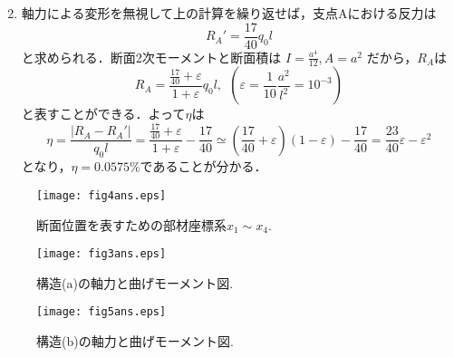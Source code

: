 \documentclass[10pt,a4j]{jarticle}
\begin{document}
\begin{enumerate}
\begin{equation}
		\label{eqn:}
	\end{equation}
\item
	軸力による変形を無視して上の計算を繰り返せば，支点Aにおける反力は
	\begin{equation}
		R_A'=\frac{17}{40}q_0l
	\end{equation}	
	と求められる．断面2次モーメントと断面積は
	$I=\frac{a^4}{12},A=a^2$
	だから，$R_A$は
	\begin{equation}
		R_A=\frac{\frac{17}{40}+\varepsilon}{1+\varepsilon}q_0l, \ \ 
		 \left(\varepsilon=\frac{1}{10}\frac{a^2}{l^2}=10^{-3}\right)
		\label{eqn:}
	\end{equation}
	と表すことができる．よって$\eta$は
	\begin{equation}
		\eta=\frac{\left| R_A-R_A'\right|}{q_0l}=\frac{\frac{17}{40}+\varepsilon}{1+\varepsilon}-\frac{17}{40}
		\simeq 
		\left(\frac{17}{40}+\varepsilon \right) (1-\varepsilon) -\frac{17}{40}
		=\frac{23}{40}\varepsilon -\varepsilon^2
		\label{eqn:}
	\end{equation}
	となり，$\eta=0.0575$\%であることが分かる．
\end{enumerate}
\begin{figure}
	\begin{center}
	\texttt{[image: fig4ans.eps]} 
	\end{center}
	\caption{断面位置を表すための部材座標系$x_1\sim x_4$.}
	\label{fig:fig4}
\end{figure}
\begin{figure}
	\begin{center}
	\texttt{[image: fig3ans.eps]} 
	\end{center}
	\caption{構造(a)の軸力と曲げモーメント図.}
	\label{fig:fig5}
\end{figure}

\begin{figure}
	\begin{center}
	\texttt{[image: fig5ans.eps]} 
	\end{center}
	\caption{構造(b)の軸力と曲げモーメント図.}
	\label{fig:fig6}
\end{figure}
\end{document}
